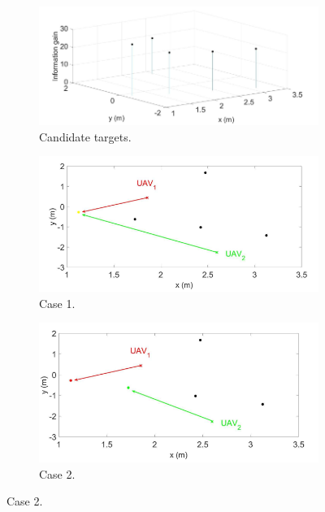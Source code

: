 \documentclass[11pt,openany]{book}
\begin{document}
\begin{figure}[H]
    \centering
    \begin{subfigure}[H]{0.6\linewidth}
        \includegraphics[width=\linewidth]{assets/3_17_a.png}
        \caption{{Candidate targets.}}
        \label{fig:3.17a}
    \end{subfigure}
    \begin{subfigure}[H]{0.6\linewidth}
        \includegraphics[width=\linewidth]{assets/3_17_b.png}
        \caption{{Case 1.}}
        \label{fig:3.17b}
    \end{subfigure}
    \begin{subfigure}[H]{0.6\linewidth}
        \includegraphics[width=\linewidth]{assets/3_17_c.png}
        \caption{{Case 2.}}

\end{subfigure}
\end{figure}
\end{document}
